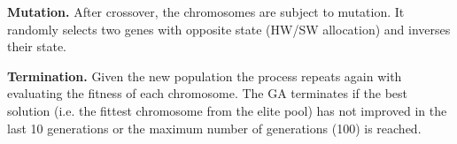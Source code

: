 \textbf{Mutation.} 
After crossover, the chromosomes are subject to mutation. It randomly selects two genes with opposite state (HW/SW allocation) and inverses their state.  


\textbf{Termination.}
Given the new population the process repeats again with evaluating the fitness of each chromosome. The GA terminates if the best solution (i.e. the fittest chromosome from the elite pool) has not improved in the last 10 generations or the maximum number of generations (100) is reached. 




